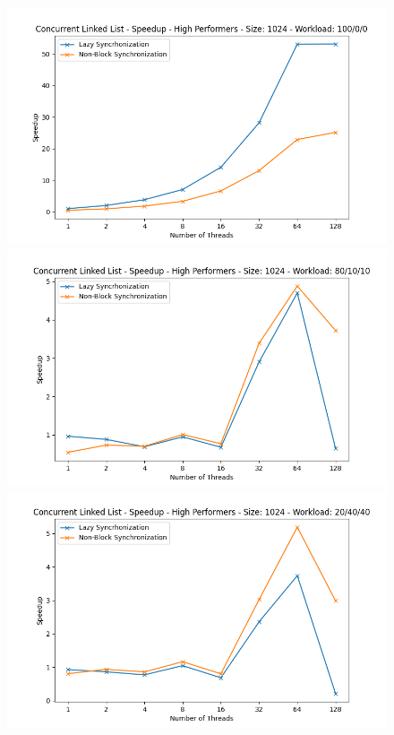 \documentclass[../final_report.tex]{subfiles}
\begin{document}
\begin{figure}[H]
    \centering
        \includegraphics[scale=0.4]{outFiles/plots/concurrent_data_structs_high_speedup_1024_100_0_0.png}
        \includegraphics[scale=0.4]{outFiles/plots/concurrent_data_structs_high_speedup_1024_80_10_10.png}
        \includegraphics[scale=0.4]{outFiles/plots/concurrent_data_structs_high_speedup_1024_20_40_40.png}

\end{figure}
\end{document}
